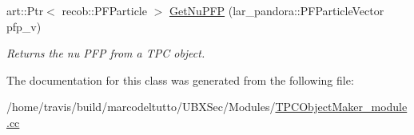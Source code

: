 \begin{DoxyCompactItemize}
art\-::\-Ptr$<$ recob\-::\-P\-F\-Particle $>$ \hyperlink{group__UBXSec_ga6a47470b5f5690a3626e14bc9f6f360c}{\-Get\-Nu\-P\-F\-P} (lar\-\_\-pandora\-::\-P\-F\-Particle\-Vector pfp\-\_\-v)
\begin{DoxyCompactList}\small\item\em \-Returns the nu \-P\-F\-P from a \-T\-P\-C object. \end{DoxyCompactList}\end{DoxyCompactItemize}


\-The documentation for this class was generated from the following file\-:\begin{DoxyCompactItemize}
\item 
/home/travis/build/marcodeltutto/\-U\-B\-X\-Sec/\-Modules/\hyperlink{TPCObjectMaker__module_8cc}{\-T\-P\-C\-Object\-Maker\-\_\-module.\-cc}\end{DoxyCompactItemize}
